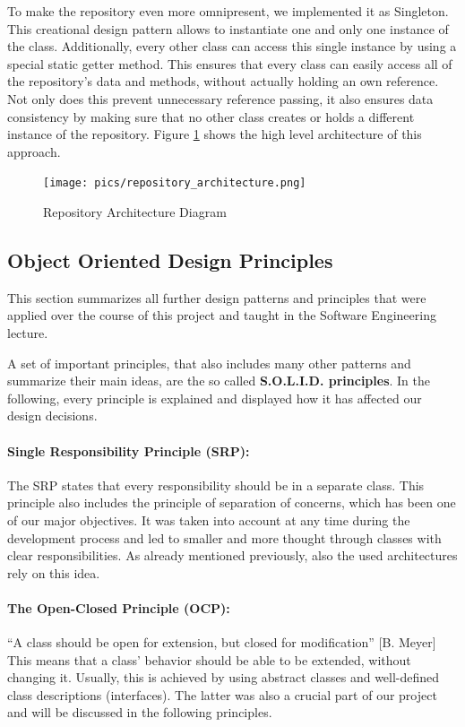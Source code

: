 To make the repository even more omnipresent, we implemented it as Singleton. This creational design pattern allows to instantiate one and only one instance of the class. Additionally, every other class can access this single instance by using a special static getter method. This ensures that every class can easily access all of the repository's data and methods, without actually holding an own reference. Not only does this prevent unnecessary reference passing, it also ensures data consistency by making sure that no other class creates or holds a different instance of the repository. Figure \ref{RepoDiagram} shows the high level architecture of this approach.

\begin{figure}[H]
\begin{center}
\texttt{[image: pics/repository\_architecture.png]}
\caption{Repository Architecture Diagram}
\label{RepoDiagram}
\end{center}
\end{figure}

\subsection{Object Oriented Design Principles}

This section summarizes all further design patterns and principles that were applied over the course of this project and taught in the Software Engineering lecture.

A set of important principles, that also includes many other patterns and summarize their main ideas, are the so called \textbf{S.O.L.I.D. principles}. In the following, every principle is explained and displayed how it has affected our design decisions.


\paragraph{Single Responsibility Principle (SRP):}
The SRP states that every responsibility should be in a separate class. This principle also includes the principle of separation of concerns, which has been one of our major objectives. It was taken into account at any time during the development process and led to smaller and more thought through classes with clear responsibilities. As already mentioned previously, also the used architectures rely on this idea.
\paragraph{The Open-Closed Principle (OCP):}
``A class should be open for extension, but closed for modification'' [B. Meyer]\\
This means that a class' behavior should be able to be extended, without changing it. Usually, this is achieved by using abstract classes and well-defined class descriptions (interfaces). The latter was also a crucial part of our project and will be discussed in the following principles.
